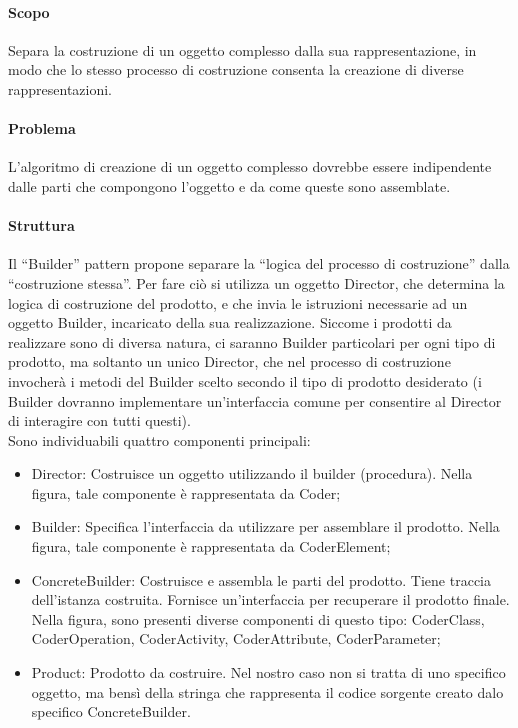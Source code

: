 \documentclass[../PianoDiQualifica.tex]{subfiles}
\begin{document}
				\paragraph{Scopo\\}
					Separa la costruzione di un oggetto complesso dalla sua
					rappresentazione, in modo che lo stesso processo di costruzione
					consenta la creazione di diverse rappresentazioni.
				\paragraph{Problema\\}
					L'algoritmo di creazione di un oggetto complesso dovrebbe essere indipendente dalle parti che compongono l'oggetto e da come queste sono assemblate.
				\paragraph{Struttura\\}
				Il “Builder” pattern propone separare la “logica del processo di
				costruzione” dalla “costruzione stessa”. Per fare ciò si utilizza un oggetto
				Director, che determina la logica di costruzione del prodotto, e che invia
				le istruzioni necessarie ad un oggetto Builder, incaricato della sua
				realizzazione. Siccome i prodotti da realizzare sono di diversa natura, ci
				saranno Builder particolari per ogni tipo di prodotto, ma soltanto un unico
				Director, che nel processo di costruzione invocherà i metodi del Builder
				scelto secondo il tipo di prodotto desiderato (i Builder dovranno
				implementare un’interfaccia comune per consentire al Director di
				interagire con tutti questi). \\
					Sono individuabili quattro componenti principali:
					\begin{itemize}
						\item Director: Costruisce un oggetto utilizzando il builder (procedura). Nella figura, tale componente è rappresentata da Coder;
						\item Builder: Specifica l’interfaccia da utilizzare per assemblare il prodotto. Nella figura, tale componente è rappresentata da CoderElement;
						\item ConcreteBuilder: Costruisce e assembla le parti del
						prodotto. Tiene traccia dell’istanza costruita. Fornisce un’interfaccia per recuperare il prodotto finale. Nella figura, sono presenti diverse componenti di questo tipo: CoderClass, CoderOperation, CoderActivity, CoderAttribute, CoderParameter;
						\item Product: Prodotto da costruire. Nel nostro caso non si tratta di uno specifico oggetto, ma bensì della stringa che rappresenta il codice sorgente creato dalo specifico ConcreteBuilder.
					\end{itemize}
\end{document}
